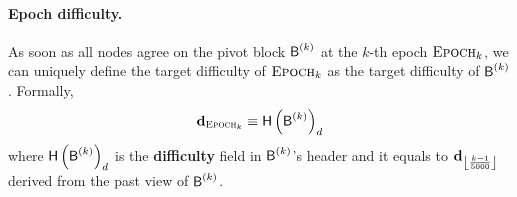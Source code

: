 \paragraph{Epoch difficulty.}
As soon as all nodes agree on the pivot block $\textsf{B}^{(k)}$ at the $k$-th epoch $\textsc{Epoch}_k$,
we can uniquely define the target difficulty of $\textsc{Epoch}_k$ as the target difficulty of $\textsf{B}^{(k)}$.
Formally, 
\begin{align}
	\mathbf{d}_{\textsc{Epoch}_k}\equiv \textsf{H}\left( \textsf{B}^{(k)} \right)_d
\end{align}
where $ \textsf{H}\left( \textsf{B}^{(k)} \right)_d$ is the {\bf difficulty} field in $\textsf{B}^{(k)}$'s header and it equals to $\mathbf{d}_{\left\lfloor \frac{k-1}{5000} \right\rfloor}$ derived from the past view of $\textsf{B}^{(k)}$.











